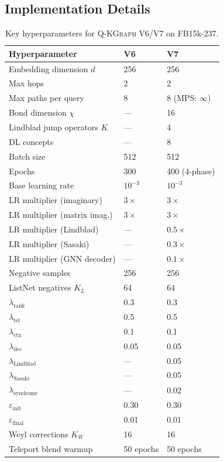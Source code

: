 \documentclass[runningheads]{llncs}
\newcommand{\QR}{\textsc{Q-KGraph}}
\begin{document}
\subsection{Implementation Details}

\begin{table}[t]
\caption{Key hyperparameters for \QR{} V6/V7 on FB15k-237.}
\label{tab:hyper}
\centering
\begin{tabular}{lll}
\toprule
Hyperparameter              & V6         & V7         \\
\midrule
Embedding dimension $d$     & 256        & 256        \\
Max hops                    & 2          & 2          \\
Max paths per query         & 8          & 8 (MPS: $\infty$) \\
Bond dimension $\chi$       & ---        & 16         \\
Lindblad jump operators $K$ & ---        & 4          \\
DL concepts                 & ---        & 8          \\
Batch size                  & 512        & 512        \\
Epochs                      & 300        & 400 (4-phase)\\
Base learning rate          & $10^{-3}$  & $10^{-3}$  \\
LR multiplier (imaginary)   & $3\times$  & $3\times$  \\
LR multiplier (matrix imag.)& $3\times$  & $3\times$  \\
LR multiplier (Lindblad)    & ---        & $0.5\times$\\
LR multiplier (Sasaki)      & ---        & $0.3\times$\\
LR multiplier (GNN decoder) & ---        & $0.1\times$\\
Negative samples            & 256        & 256        \\
ListNet negatives $K_L$     & 64         & 64         \\
$\lambda_\text{rank}$       & 0.3        & 0.3        \\
$\lambda_\text{tel}$        & 0.5        & 0.5        \\
$\lambda_\text{ctx}$        & 0.1        & 0.1        \\
$\lambda_\text{dec}$        & 0.05       & 0.05       \\
$\lambda_\text{Lindblad}$   & ---        & 0.05       \\
$\lambda_\text{Sasaki}$     & ---        & 0.05       \\
$\lambda_\text{syndrome}$   & ---        & 0.02       \\
$\varepsilon_\text{init}$   & 0.30       & 0.30       \\
$\varepsilon_\text{final}$  & 0.01       & 0.01       \\
Weyl corrections $K_W$      & 16         & 16         \\
Teleport blend warmup       & 50 epochs  & 50 epochs  \\
\bottomrule
\end{tabular}
\end{table}
\end{document}
